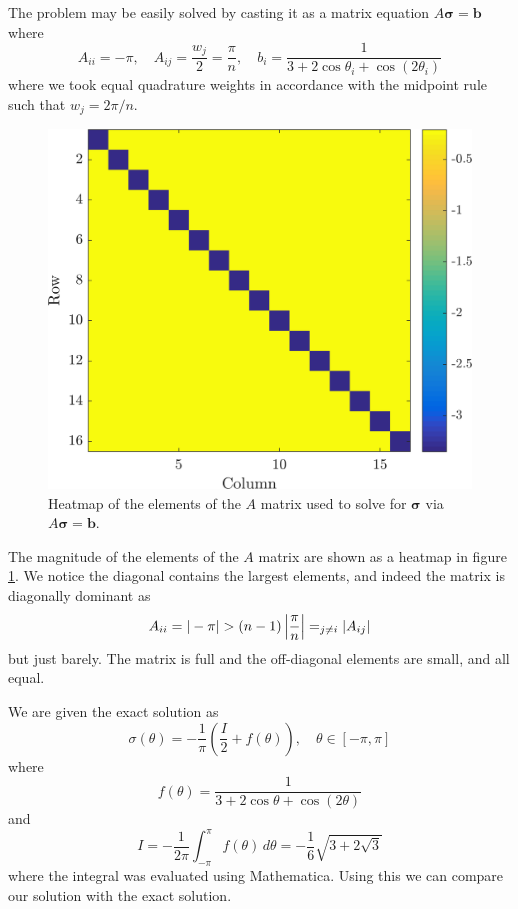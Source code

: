 \documentclass[11pt]{article}
\let\sumop\relax
\begin{document}
The problem may be easily solved by casting it as a matrix equation $A\bm{\sigma} = \bm{b}$ where
\begin{equation*}
  A_{ii} = -\pi, \quad
  A_{ij} = \frac{w_j}{2} = \frac{\pi}{n}, \quad
  b_i = \frac{1}{3 + 2\cos\theta_i + \cos(2\theta_i)}
\end{equation*}
where we took equal quadrature weights in accordance with the midpoint rule such that $w_j = 2\pi/n$.

\begin{figure}[!htb]
  \centering
  \includegraphics[width=0.7\linewidth]{matrix_heatmap.png}
  \caption{Heatmap of the elements of the $A$ matrix used to solve for $\bm{\sigma}$ via $A\bm{\sigma} = \bm{b}$.}
  \label{fig:matrix_heatmap}
\end{figure}

The magnitude of the elements of the $A$ matrix are shown as a heatmap in figure \ref{fig:matrix_heatmap}. We notice the diagonal contains the largest elements, and indeed the matrix is diagonally dominant as
\begin{equation*}
A_{ii} = |-\pi| > (n-1)\left\lvert \frac{\pi}{n} \right\rvert = \sumop_{j\ne i} |A_{ij}|
\end{equation*}
but just barely. The matrix is full and the off-diagonal elements are small, and all equal.

We are given the exact solution as
\begin{equation}
  \sigma(\theta) = -\frac{1}{\pi} \left( \frac{I}{2} + f(\theta) \right), \quad \theta \in [-\pi, \pi]
\end{equation}
where 
\begin{equation}
  f(\theta) = \frac{1}{3 + 2\cos\theta + \cos(2\theta)}
\end{equation}
and
\begin{equation*}
  I = - \frac{1}{2\pi} \int_{-\pi}^\pi f(\theta) \, d\theta
  = -\frac{1}{6} \sqrt{3 + 2\sqrt{3}}
\end{equation*}
where the integral was evaluated using Mathematica. Using this we can compare our solution with the exact solution.
\end{document}
